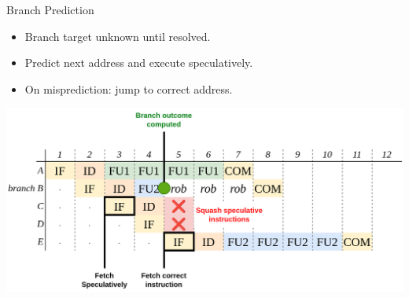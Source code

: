 \documentclass{beamer}
\begin{document}
\begin{frame}{Branch Prediction}
    \begin{itemize}
        \item Branch target unknown until resolved.
        \item Predict next address and execute speculatively.
        \item On misprediction: jump to correct address.
    \end{itemize}
    \includegraphics[width=\textwidth]{pic/bp-demo.png}
\end{frame}
\end{document}
